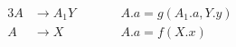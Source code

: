 
\begin{alignat*}{3}
  A &\to A_{1} Y \qquad && A.a = g(A_{1}.a, Y.y) \\[8pt]
  A &\to X && A.a = f(X.x)
\end{alignat*}